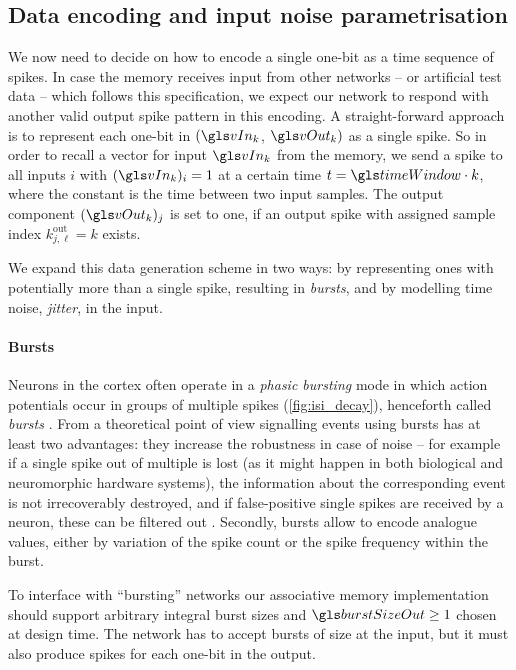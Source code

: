 \subsection{Data encoding and input noise parametrisation}
\label{sec:input_data_parametrisation}

We now need to decide on how to encode a single one-bit as a time sequence of spikes. In case the memory receives input from other networks -- or artificial test data -- which follows this 
specification, we expect our network to respond with another valid output spike pattern in this encoding.
A straight-forward approach is to represent each one-bit in $(\vIn_k$, $\vOut_k)$ as a single spike. So in order to recall a vector for input $\vIn_k$ from the memory, we send a spike to all inputs $i$ with $(\vIn_k)_i = 1$ at a certain time $t = \timeWindow \cdot k$, where the constant \timeWindow is the time between two input samples. The output component $(\vOut_k)_j$ is set to one, if an output spike with assigned sample index \(k^{\mathrm{out}}_{j, \ell} = k\) exists.

We expand this data generation scheme in two ways: by representing ones with potentially more than a single spike, resulting in \emph{bursts}, and by modelling time noise, \emph{jitter}, in the input.

\paragraph{Bursts}
Neurons in the cortex often operate in a \emph{phasic bursting} mode in which action potentials occur in groups of multiple spikes (\cref{fig:isi_decay}), henceforth called \emph{bursts} \cite{connors1990intrinsic}. From a theoretical point of view signalling events using bursts has at least two advantages: they increase the robustness in case of noise -- for example if a single spike out of multiple is lost (as it might happen in both biological and neuromorphic hardware systems), the information about the corresponding event is not irrecoverably destroyed, and if false-positive single spikes are received by a neuron, these can be filtered out \cite{lisman1997bursts}. Secondly, bursts allow to encode analogue values, either by variation of the spike count or the spike frequency within the burst.

To interface with \enquote{bursting} networks our associative memory implementation should support arbitrary integral burst sizes \burstSizeIn and \(\burstSizeOut \geq 1\) chosen at design time. The network has to accept bursts of size \burstSizeIn at the input, but it must also produce \burstSizeOut spikes for each one-bit in the output.

